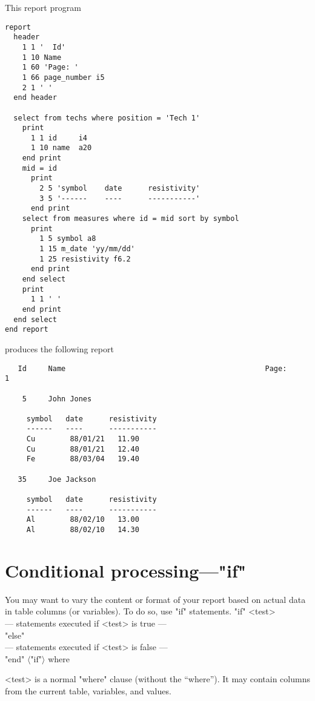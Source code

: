 \documentclass[11pt,a4paper]{report}
\def\opt#1{$\langle \mbox{#1} \rangle$}
\def\I{\index}
\begin{document}
\demobreak
This report program
\begin{verbatim}
report
  header
    1 1 '  Id'
    1 10 Name
    1 60 'Page: '
    1 66 page_number i5
    2 1 ' '
  end header
 
  select from techs where position = 'Tech 1'
    print
      1 1 id     i4
      1 10 name  a20
    end print
    mid = id
      print
        2 5 'symbol    date      resistivity'
        3 5 '------    ----      -----------'
      end print
    select from measures where id = mid sort by symbol
      print
        1 5 symbol a8
        1 15 m_date 'yy/mm/dd'
        1 25 resistivity f6.2
      end print
    end select
    print
      1 1 ' '
    end print
  end select
end report
\end{verbatim}
\demobreak
produces the following report
 
\Rimdisp
\begin{verbatim}
   Id     Name                                              Page:     1
 
    5     John Jones
 
     symbol   date      resistivity
     ------   ----      -----------
     Cu        88/01/21   11.90
     Cu        88/01/21   12.40
     Fe        88/03/04   19.40
 
   35     Joe Jackson
 
     symbol   date      resistivity
     ------   ----      -----------
     Al        88/02/10   13.00
     Al        88/02/10   14.30
\end{verbatim}
\enddisp
 
 
 
\section{Conditional processing---"if"}
%
\I{if statement}
\I{else statement}
You may want to vary the content or format of your report
based on actual data in table columns (or variables).
To do so, use "if" statements.
"if" <test>\\
  --- statements executed if <test> is true ---\\
  "else"\\
  --- statements executed if <test> is false ---\\
  "end" \opt{"if"}
where
\begin{List}
\item[<test>] is a normal "where" clause (without the
``where'').  It may contain columns from the current table,
variables, and values.
\end{List}
 
\end{document}

